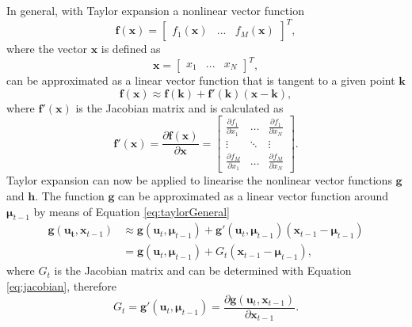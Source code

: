 \documentclass[12pt,oneside,openany,a4paper, %
afrikaans,english,
]{memoir}
\numberwithin{equation}{chapter}
\begin{document}
In general, with Taylor expansion a nonlinear vector function
\begin{equation}
\bm{f}(\bm{x}) =
\begin{bmatrix}
f_1(\bm{x}) & ... & f_M(\bm{x})
\end{bmatrix}^T,
\end{equation}
where the vector $\bm{x}$ is defined as
\begin{equation}
\bm{x} =
\begin{bmatrix}
x_1 & ... & x_N
\end{bmatrix}^T,
\end{equation}
can be approximated as a linear vector function that is tangent to a given point $\bm{k}$ 
\begin{equation}\label{eq:taylorGeneral}
\bm{f}(\bm{x}) \approx \bm{f}(\bm{k}) + \bm{f}'(\bm{k})(\bm{x-k}),
\end{equation}
where $\bm{f}'(\bm{x})$ is the Jacobian matrix and is calculated as
\begin{equation}\label{eq:jacobian}
\bm{f}'(\bm{x}) = \frac{\partial\bm{f}(\bm{x})}{\partial \bm{x}} =
\begin{bmatrix}
\frac{\partial f_1}{\partial x_1} & \dots &\frac{\partial f_1}{\partial x_N}\\
\vdots & \ddots &\vdots\\
\frac{\partial f_M}{\partial x_1} & \dots &\frac{\partial f_M}{\partial x_N}
\end{bmatrix}.
\end{equation}
Taylor expansion can now be applied to linearise the nonlinear vector functions $\bm{g}$ and $\bm{h}$. The function $\bm{g}$ can be approximated as a linear vector function around $\bm{\mu}_{t-1}$ by means of Equation \ref{eq:taylorGeneral}
\begin{equation}\label{eq:linear_taylor}
\begin{split}
\bm{g}(\bm{u_t}, \bm{x}_{t-1}) & \approx \bm{g}(\bm{u}_t, \bm{\mu}_{t-1}) + \bm{g}'(\bm{u}_t, \bm{\mu}_{t-1})(\bm{x}_{t-1} - \bm{\mu}_{t-1})\\
& = \bm{g}(\bm{u}_t, \bm{\mu}_{t-1}) + G_t(\bm{x}_{t-1} - 
\bm{\mu}_{t-1}),
\end{split}  
\end{equation}
where $G_t$ is the Jacobian matrix and can be determined with Equation \ref{eq:jacobian}, therefore
\begin{equation}\label{eq:Gt}
G_t = \bm{g}'(\bm{u}_t, \bm{\mu}_{t-1}) = \frac{\partial \bm{g}(\bm{u}_t, \bm{x}_{t-1})}{\partial \bm{x}_{t-1}}.
\end{equation}
\end{document}
